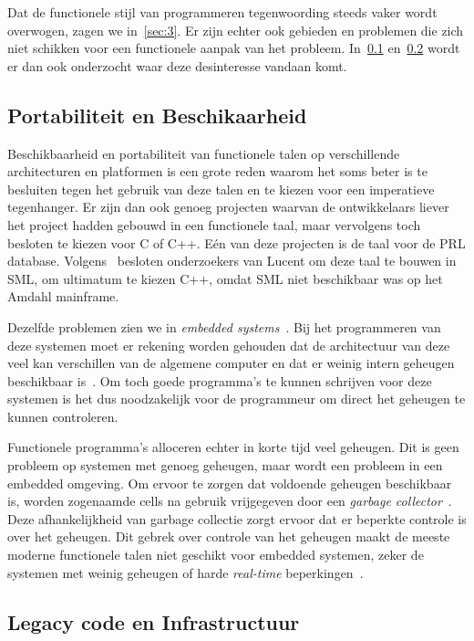 \documentclass[twoside,twocolumn]{article}
\begin{document}
Dat de functionele stijl van programmeren tegenwoording steeds vaker wordt
overwogen, zagen we in~\cref{sec:3}. Er zijn echter ook gebieden en problemen
die zich niet schikken voor een functionele aanpak van het probleem.
In~\cref{subsec:4-1} en~\cref{subsec:4-2} wordt er dan ook onderzocht waar deze
desinteresse vandaan komt.

\subsection{Portabiliteit en Beschikaarheid}
\label{subsec:4-1}

Beschikbaarheid en portabiliteit van functionele talen op verschillende
architecturen en platformen is een grote reden waarom het soms beter is te
besluiten tegen het gebruik van deze talen en te kiezen voor een imperatieve
tegenhanger. Er zijn dan ook genoeg projecten waarvan de ontwikkelaars liever
het project hadden gebouwd in een functionele taal, maar vervolgens toch
besloten te kiezen voor C of C++. E\'en van deze projecten is de taal voor de
PRL database. Volgens~\textcite{src19} besloten onderzoekers van Lucent om
deze taal te bouwen in SML, om ultimatum te kiezen C++, omdat SML niet
beschikbaar was op het Amdahl mainframe.

Dezelfde problemen zien we in \textit{embedded systems}~\cite{src20}. Bij het
programmeren van deze systemen moet er rekening worden gehouden dat de
architectuur van deze veel kan verschillen van de algemene computer en dat er
weinig intern geheugen beschikbaar is~\cite{src21,src22}. Om toch goede
programma's te kunnen schrijven voor deze systemen is het dus noodzakelijk voor
de programmeur om direct het geheugen te kunnen controleren.

Functionele programma's alloceren echter in korte tijd veel geheugen. Dit is
geen probleem op systemen met genoeg geheugen, maar wordt een probleem in
een embedded omgeving. Om ervoor te zorgen dat voldoende geheugen beschikbaar
is, worden zogenaamde cells na gebruik vrijgegeven door een \textit{garbage
collector}~\cite{src23}. Deze afhankelijkheid van garbage collectie zorgt ervoor dat er
beperkte controle is over het geheugen. Dit gebrek over controle van het
geheugen maakt de meeste moderne functionele talen niet geschikt voor embedded
systemen, zeker de systemen met weinig geheugen of harde \textit{real-time}
beperkingen~\cite{src24}.

\subsection{Legacy code en Infrastructuur}
\label{subsec:4-2}
\end{document}
